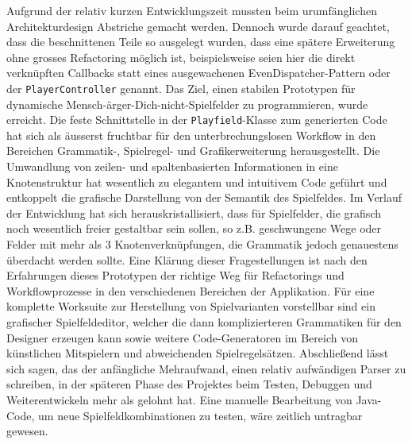 \documentclass[conference]{IEEEtran}
\begin{document}
Aufgrund der relativ kurzen Entwicklungszeit mussten beim urumf\"anglichen Architekturdesign Abstriche gemacht werden.
Dennoch wurde darauf geachtet, dass die beschnittenen Teile so ausgelegt wurden, dass eine sp\"atere Erweiterung
ohne grosses Refactoring m\"oglich ist, beispielsweise seien hier die direkt verkn\"upften Callbacks statt eines ausgewachenen EvenDispatcher-Pattern oder der \texttt{PlayerController} genannt. Das Ziel, einen stabilen Prototypen f\"ur dynamische Mensch-\"arger-Dich-nicht-Spielfelder zu programmieren, wurde erreicht. Die feste Schnittstelle in der \texttt{Playfield}-Klasse zum generierten Code hat sich als \"ausserst fruchtbar f\"ur den unterbrechungslosen Workflow in den Bereichen Grammatik-, Spielregel- und Grafikerweiterung herausgestellt. Die Umwandlung von zeilen- und spaltenbasierten Informationen in eine Knotenstruktur hat wesentlich zu elegantem und intuitivem Code gef\"uhrt und entkoppelt die grafische Darstellung von der Semantik des Spielfeldes. Im Verlauf der Entwicklung hat sich herauskristallisiert, dass f\"ur Spielfelder, die grafisch noch wesentlich freier gestaltbar sein sollen, so z.B. geschwungene Wege oder Felder mit mehr als 3 Knotenverkn\"upfungen, die Grammatik jedoch genauestens \"uberdacht werden sollte. Eine Kl\"arung dieser Fragestellungen ist nach den Erfahrungen dieses Prototypen der richtige Weg f\"ur Refactorings und Workflowprozesse in den verschiedenen Bereichen der Applikation. F\"ur eine komplette Worksuite zur Herstellung von Spielvarianten vorstellbar sind ein grafischer Spielfeldeditor, welcher die dann komplizierteren Grammatiken f\"ur den Designer erzeugen kann sowie weitere Code-Generatoren im Bereich von k\"unstlichen Mitspielern und abweichenden Spielregels\"atzen. Abschlie{\ss}end l\"asst sich sagen, das der anf\"angliche Mehraufwand, einen relativ aufw\"andigen Parser zu schreiben, in der sp\"ateren Phase des Projektes beim Testen, Debuggen und Weiterentwickeln mehr als gelohnt hat. Eine manuelle Bearbeitung von Java-Code, um neue Spielfeldkombinationen zu testen, w\"are zeitlich untragbar gewesen.






\end{document}
